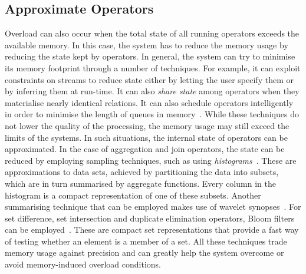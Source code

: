 \subsection*{Approximate Operators} 
Overload can also occur when the total state of all running operators exceeds the available memory. 
In this case, the system has to reduce the memory usage by reducing the state kept by operators. 
In general, the system can try to minimise its memory footprint through a number
of techniques.
For example, it can exploit constraints on streams to reduce state either by letting the user specify
them or by inferring them at run-time. It can also \emph{share state} among operators when they materialise nearly
identical relations.
It can also schedule operators intelligently in order to minimise the length of queues in
memory~\cite{stream-chains}.
While these techniques do not lower the quality of the processing, the memory usage may still exceed the
limits of the systems. In such situations, the internal state of operators can be approximated. In the
case of aggregation and join operators, the state can be reduced by employing sampling techniques, such
as using \emph{histograms}~\cite{histograms}. These are approximations to data sets, achieved by
partitioning the data into subsets, which are in turn summarised by aggregate functions. Every column in the histogram is a compact
representation of one of these subsets. Another summarising technique that can be employed makes use of
wavelet synopses~\cite{wavelets}. For set difference, set intersection and duplicate
elimination operators, Bloom filters can be employed~\cite{bloom}. These are compact set representations
that provide a fast way of testing whether an element is a member of a set. All these techniques trade
memory usage against precision and can greatly help the system overcome or avoid memory-induced overload
conditions.

